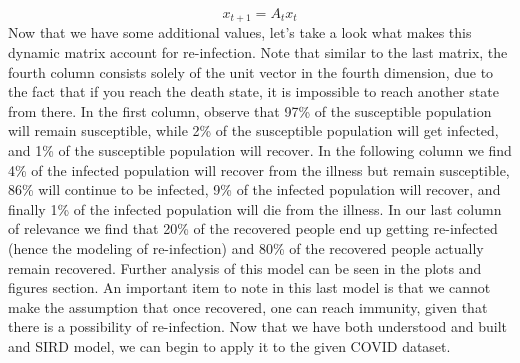 \documentclass[conference]{IEEEtran}
\begin{document}
\begin{equation}
    x_{t+1}=A_{t}x_{t} \label{eq}
\end{equation}
Now that we have some additional values, let's take a look what makes this dynamic matrix account for re-infection. Note that similar to the last matrix, the fourth column consists solely of the unit vector in the fourth dimension, due to the fact that if you reach the death state, it is impossible to reach another state from there. In the first column, observe that 97\% of the susceptible population will remain susceptible, while 2\% of the susceptible population will get infected, and 1\% of the susceptible population will recover. In the following column we find 4\% of the infected population will recover from the illness but remain susceptible, 86\% will continue to be infected, 9\% of the infected population will recover, and finally 1\% of the infected population will die from the illness. In our last column of relevance we find that 20\% of the recovered people end up getting re-infected (hence the modeling of re-infection) and 80\% of the recovered people actually remain recovered. Further analysis of this model can be seen in the plots and figures section. An important item to note in this last model is that we cannot make the assumption that once recovered, one can reach immunity, given that there is a possibility of re-infection. Now that we have both understood and built and SIRD model, we can begin to apply it to the given COVID dataset.
\end{document}
